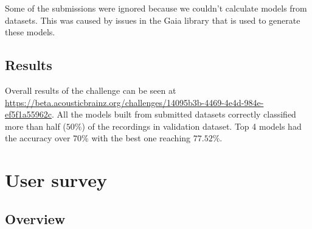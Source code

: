 Some of the submissions were ignored because we couldn't calculate models from datasets. This was caused by issues in the Gaia library that is used to generate these models.

\subsection{Results}

Overall results of the challenge can be seen at \url{https://beta.acousticbrainz.org/challenges/14095b3b-4469-4e4d-984e-ef5f1a55962c}. All the models built from submitted datasets correctly classified more than half ($50\%$) of the recordings in validation dataset. Top 4 models had the accuracy over $70\%$ with the best one reaching $77.52\%$.


\section{User survey}

\subsection{Overview}

